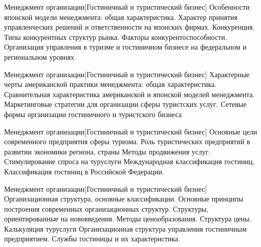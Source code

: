 \documentclass[
	11pt,
	a4paper,
	]
	{article}
\begin{document}
\begin{minipage}[t][\miniH]{\miniL}\centering
	 {Менеджмент организации}[Гостиничный и туристический бизнес]
		{
			Особенности японской модели менеджмента: общая характеристика. Характер принятия управленческих решений и ответственности на японских фирмах.
		}{
			Конкуренция. Типы конкурентных структур рынка. Факторы конкурентоспособности.
		}{
			Организация управления в туризме и гостиничном бизнесе на федеральном и региональном уровнях
		}
	\lowGE
\end{minipage}

\vfill



\begin{minipage}[t][\miniH]{\miniL}\centering
	 {Менеджмент организации}[Гостиничный и туристический бизнес]
		{
			Характерные черты американской практики менеджмента: общая характеристика. Сравнительная характеристика американской и японской моделей менеджмента.
		}{
			Маркетинговые стратегии для организации сферы туристских услуг.
		}{
			Сетевые формы организации гостиничного и туристского бизнеса
		}
	\lowGE
\end{minipage}

\vfill



\begin{minipage}[t][\miniH]{\miniL}\centering
	 {Менеджмент организации}[Гостиничный и туристический бизнес]
		{
			Основные цели современного предприятия сферы туризма. Роль туристических предприятий в развитии экономики региона, страны
		}{
			Методы продвижения услуг. Стимулирование спроса на туруслуги
		}{
			Международная классификация гостиниц. Классификация гостиниц в Российской Федерации.
		}
	\lowGE
\end{minipage}





\begin{minipage}[t][\miniH]{\miniL}\centering
	 {Менеджмент организации}[Гостиничный и туристический бизнес]
		{
			Организационная структура, основные классификации. Основные принципы построения современных организационных структур. Структуры, ориентированные на нововведения.
		}{
			Методы ценообразования. Структура цены. Калькуляция туруслуги
		}{
			Организационная структура управления гостиничным предприятием. Службы гостиницы и их характеристика.
		}
	\lowGE
\end{minipage}
\end{document}
